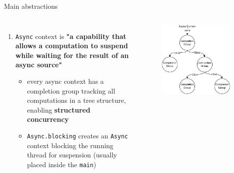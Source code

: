 \documentclass[aspectratio=169,xcolor=dvipsnames]{beamer}
\begin{document}
\begin{frame}
    \begin{block}{Main abstractions}
        \begin{columns}[c,onlytextwidth]
            \begin{enumerate}
                \item \texttt{Async} context is \textbf{"a capability that allows a computation to suspend while waiting for the result of an async source"}
                
                \begin{itemize}
                    \item every async context has a completion group tracking all computations in a tree structure, enabling \textbf{structured concurrency}
                    \item \texttt{Async.blocking} creates an \texttt{Async} context blocking the running thread for suspension (usually placed inside the \texttt{main})
                    
                \end{itemize}
            \end{enumerate}
            \begin{figure}
                \centering
                \includegraphics[width=\textwidth]{./images/structured-concurrency.pdf}
            \end{figure}
        \end{columns}
    \end{block}
\end{frame}
\end{document}
